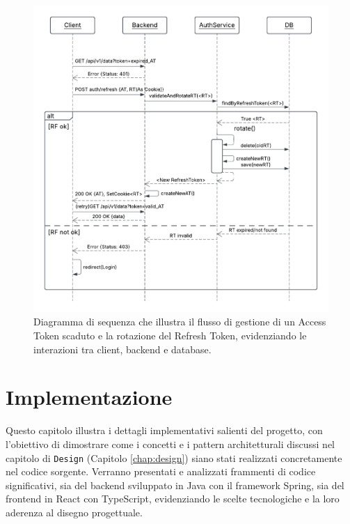 \documentclass[12pt,a4paper,openright,twoside]{book}
\begin{document}
\vspace{1cm}
\begin{figure}[h!]
    \centering
    \includegraphics[width=\textwidth]{figures/expired_ac.pdf}
    \caption{Diagramma di sequenza che illustra il flusso di gestione di un Access Token scaduto e la rotazione del Refresh Token, evidenziando le interazioni tra client, backend e database.}
    \label{fig:token_rotation_sequence_uml}
\end{figure}
\vspace{1cm}
\chapter{Implementazione}
\label{chap:implementazione}

Questo capitolo illustra i dettagli implementativi salienti del progetto, con l'obiettivo di dimostrare come i concetti e i pattern architetturali discussi nel capitolo di \texttt{Design} (Capitolo \ref{chap:design}) siano stati realizzati concretamente nel codice sorgente. Verranno presentati e analizzati frammenti di codice significativi, sia del backend sviluppato in Java con il framework Spring, sia del frontend in React con TypeScript, evidenziando le scelte tecnologiche e la loro aderenza al disegno progettuale.
\end{document}
